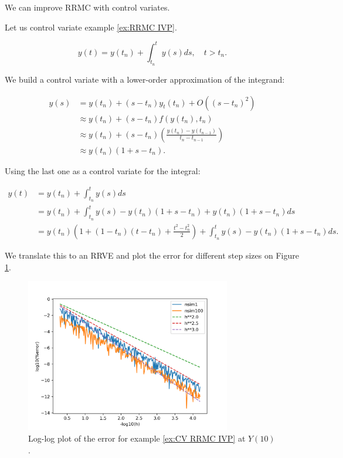 \documentclass[a4paper,12pt]{article}
\begin{document}
We can improve RRMC with control variates.
\begin{example}[CV RRMC $y_t=y$]\label{ex:CV RRMC IVP}
    Let us control variate example \ref{ex:RRMC IVP}.

    \begin{equation}
        y(t)= y(t_{n}) + \int_{t_{n}}^{t}y(s)ds , \quad t>t_{n}.
    \end{equation}

    We build a control variate with a lower-order approximation
    of the integrand:

    \begin{align}
        y(s) & = y(t_{n}) + (s-t_{n})y_t(t_{n}) + O((s-t_{n})^{2})      \\
             & \approx y(t_{n}) + (s-t_{n})f(y(t_{n}),t_{n})            \\
             & \approx y(t_{n}) +
        (s-t_{n})\left(\frac{y(t_{n})-y(t_{n-1})}{t_{n}-t_{n-1}}\right) \\
             & \approx y(t_{n})(1+s-t_{n}).
    \end{align}

    Using the last one as a control variate for the integral:

    \begin{align}
        y(t) & = y(t_{n}) + \int_{t_{n}}^{t}y(s)ds                                          \\
             & = y(t_{n}) + \int_{t_{n}}^{t}y(s)-y(t_{n})(1+s-t_{n}) +y(t_{n})(1+s-t_{n})ds \\
             & = y(t_{n})\left(1 + (1-t_{n})(t-t_{n})+\frac{t^{2}-t_{n}^{2}}{2}\right)
        + \int_{t_{n}}^{t}y(s)-y(t_{n})(1+s-t_{n})ds.
    \end{align}

    We translate this to an RRVE and
    plot the error for different step sizes on Figure \ref{fig:CV RRMC IVP}.

    \begin{figure}[h!]
        \centering
        \includegraphics[width=0.8\textwidth]{plots/CV RRMC IVP.png}
        \caption{Log-log plot of the error for example
            \ref{ex:CV RRMC IVP} at $Y(10)$.}
        \label{fig:CV RRMC IVP}
    \end{figure}
\end{example}
\end{document}
